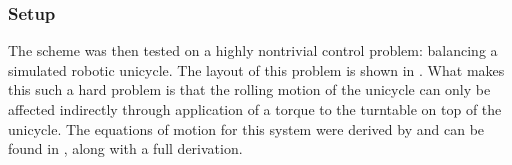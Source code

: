%
%
%  
%  
%  








\subsubsection{Setup}
The scheme was then tested on a highly nontrivial control problem: balancing a simulated robotic unicycle. The layout of this problem is shown in . What makes this such a hard problem is that the rolling motion of the unicycle can only be affected indirectly through application of a torque to the turntable on top of the unicycle. The equations of motion for this system were derived by \cite{For09} and can be found in , along with a full derivation. 

